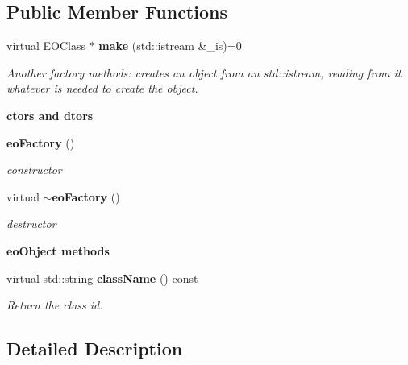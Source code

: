 \subsection*{Public Member Functions}
\begin{CompactItemize}
\item 
virtual EOClass $\ast$ {\bf make} (std::istream \&\_\-is)=0
\begin{CompactList}\small\item\em Another factory methods: creates an object from an std::istream, reading from it whatever is needed to create the object. \item\end{CompactList}\end{CompactItemize}
\begin{Indent}{\bf ctors and dtors}\par
\begin{CompactItemize}
\item 
{\bf eo\-Factory} ()\label{classeo_factory_z11_0}

\begin{CompactList}\small\item\em constructor \item\end{CompactList}\item 
virtual {\bf $\sim$eo\-Factory} ()\label{classeo_factory_z11_1}

\begin{CompactList}\small\item\em destructor \item\end{CompactList}\end{CompactItemize}
\end{Indent}
\begin{Indent}{\bf eo\-Object methods}\par
\begin{CompactItemize}
\item 
virtual std::string {\bf class\-Name} () const \label{classeo_factory_z13_0}

\begin{CompactList}\small\item\em Return the class id. \item\end{CompactList}\end{CompactItemize}
\end{Indent}


\subsection{Detailed Description}

